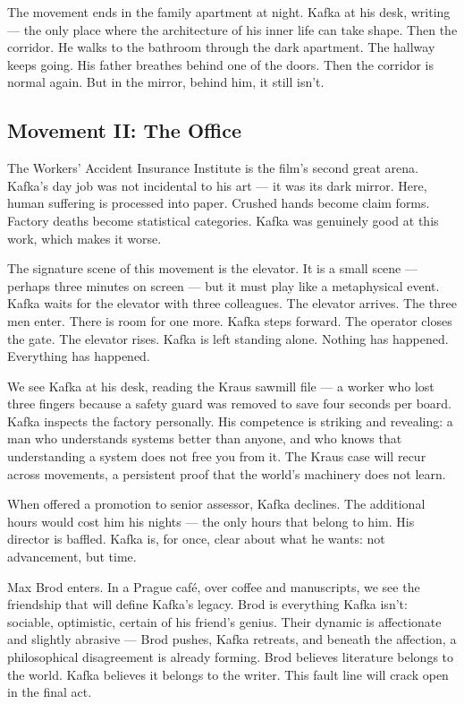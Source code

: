 The movement ends in the family apartment at night. Kafka at his desk, writing --- the only place where the architecture of his inner life can take shape. Then the corridor. He walks to the bathroom through the dark apartment. The hallway keeps going. His father breathes behind one of the doors. Then the corridor is normal again. But in the mirror, behind him, it still isn't.

\subsection{Movement II: The Office}

The Workers' Accident Insurance Institute is the film's second great arena. Kafka's day job was not incidental to his art --- it was its dark mirror. Here, human suffering is processed into paper. Crushed hands become claim forms. Factory deaths become statistical categories. Kafka was genuinely good at this work, which makes it worse.

The signature scene of this movement is the elevator. It is a small scene --- perhaps three minutes on screen --- but it must play like a metaphysical event. Kafka waits for the elevator with three colleagues. The elevator arrives. The three men enter. There is room for one more. Kafka steps forward. The operator closes the gate. The elevator rises. Kafka is left standing alone. Nothing has happened. Everything has happened.

We see Kafka at his desk, reading the Kraus sawmill file --- a worker who lost three fingers because a safety guard was removed to save four seconds per board. Kafka inspects the factory personally. His competence is striking and revealing: a man who understands systems better than anyone, and who knows that understanding a system does not free you from it. The Kraus case will recur across movements, a persistent proof that the world's machinery does not learn.

When offered a promotion to senior assessor, Kafka declines. The additional hours would cost him his nights --- the only hours that belong to him. His director is baffled. Kafka is, for once, clear about what he wants: not advancement, but time.

Max Brod enters. In a Prague café, over coffee and manuscripts, we see the friendship that will define Kafka's legacy. Brod is everything Kafka isn't: sociable, optimistic, certain of his friend's genius. Their dynamic is affectionate and slightly abrasive --- Brod pushes, Kafka retreats, and beneath the affection, a philosophical disagreement is already forming. Brod believes literature belongs to the world. Kafka believes it belongs to the writer. This fault line will crack open in the final act.

